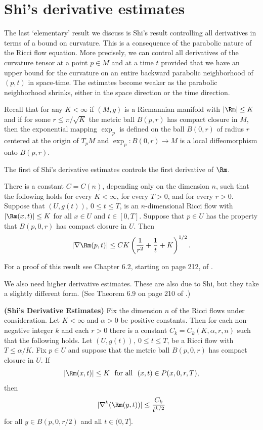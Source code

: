 \section{Shi's derivative estimates}

The last `elementary' result we discuss is Shi's result controlling all derivatives in terms of a
bound on curvature. This is a consequence of the parabolic nature of
the Ricci flow equation. More precisely, we can control all
derivatives of the curvature tensor at a point $p\in M$ and at a
time $t$ provided that we have an upper bound for the curvature on
an entire backward parabolic neighborhood of $(p,t)$ in space-time.
The estimates become weaker as the parabolic neighborhood shrinks,
either in the space direction or the time direction.

Recall that for any $K<\infty$  if $(M,g)$ is a Riemannian manifold
with $|\Rm|\le K$ and if for some $r\le \pi/\sqrt{K}$ the metric ball
$B(p,r)$ has compact closure in $M$, then the exponential mapping
$\exp_p$ is defined on the ball $B(0,r)$ of radius $r$ centered
at the origin of $T_pM$ and $\exp_p\colon B(0,r)\to M$ is a
local diffeomorphism onto $B(p,r)$.


The first of Shi's derivative estimates controls the first
derivative of $\Rm$.

\begin{theorem}\label{thm:shi-first-derivative}
\label{firstshi}
There is a constant $C=C(n)$, depending only on the dimension $n$,
such that the following holds for every $K<\infty$, for every $T>0$,
and for every $r>0$. Suppose that $(U,g(t)),\ 0\le t\le T$, is an $n$-dimensional
Ricci flow with $|\Rm(x,t)|\le K$ for all $x\in U$ and $t\in [0,T]$.
Suppose that $p\in U$ has the property that $B(p,0,r)$ has compact
closure in $U$. Then
$$|\nabla \Rm(p,t)|\le
CK\left(\frac{1}{r^2}+\frac{1}{t}+K\right)^{1/2}.$$
\end{theorem}


For a proof of this result see Chapter 6.2, starting on page 212, of
\cite{ChowLuNi}.

We also need higher derivative estimates. These are also due to Shi,
but they take a slightly different form. (See Theorem 6.9 on page
210 of \cite{ChowLuNi}.)


\begin{theorem}\label{thm:shi-derivative-estimates}
\label{shi}
{\bf (Shi's Derivative Estimates)} Fix the dimension $n$ of the Ricci flows under consideration. Let
$K<\infty$ and $\alpha>0$ be positive constants.  Then for each
non-negative integer $k$ and each $r>0$ there is a constant
$C_k=C_k(K,\alpha,r,n)$ such that the following holds. Let
$(U,g(t)),\ 0\le t\le T$, be a Ricci flow with $T\le \alpha/K$.
Fix $p\in U$ and suppose that the metric ball $B(p,0,r)$ has compact
closure in $U$. If
$$|\Rm(x,t)|\le K\ \ \text{for all }\ (x,t)\in P(x,0,r,T),$$
then
$$|\nabla^k(\Rm(y,t))|\le \frac{C_k}{t^{k/2}}$$
for all $y\in B(p,0,r/2)$ and all $t\in(0,T]$.
\end{theorem}

